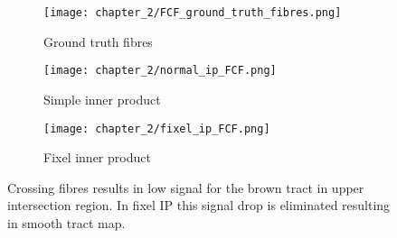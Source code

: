 \begin{figure}
  \centering
  \begin{subfigure}[b]{0.3\textwidth}
  \centering
  \texttt{[image: chapter\_2/FCF\_ground\_truth\_fibres.png]}
  \caption{Ground truth fibres}
  \label{}
  \end{subfigure}%
  \begin{subfigure}[b]{0.3\textwidth}
  \texttt{[image: chapter\_2/normal\_ip\_FCF.png]}
  \caption{Simple inner product}
  \label{}
  \end{subfigure}%
  \begin{subfigure}[b]{0.3\textwidth}
  \texttt{[image: chapter\_2/fixel\_ip\_FCF.png]}
  \caption{Fixel inner product}
  \label{}
  \end{subfigure}
  \caption{Crossing fibres results in low signal for the brown tract in upper intersection region. In fixel IP this signal drop is eliminated resulting in smooth tract map.}\label{fig:fixip}
\end{figure}
